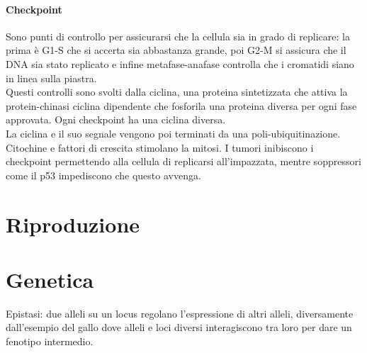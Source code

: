 \documentclass[10pt]{article}
\begin{document}
\paragraph*{Checkpoint} Sono punti di controllo per assicurarsi che la cellula sia in grado di replicare: la prima è G1-S che si accerta sia abbastanza grande, poi G2-M si assicura che il DNA sia stato replicato e infine metafase-anafase controlla che i cromatidi siano in linea sulla piastra.\\
Questi controlli sono svolti dalla ciclina, una proteina sintetizzata che attiva la protein-chinasi ciclina dipendente che fosforila una proteina diversa per ogni fase approvata. Ogni checkpoint ha una ciclina diversa.\\
La ciclina e il suo segnale vengono poi terminati da una poli-ubiquitinazione.\\
Citochine e fattori di crescita stimolano la mitosi. I tumori inibiscono i checkpoint permettendo alla cellula di replicarsi all'impazzata, mentre soppressori come il p53 impediscono che questo avvenga.\\
\section*{Riproduzione}
\section*{Genetica}
Epistasi: due alleli su un locus regolano l'espressione di altri alleli, diversamente dall'esempio del gallo dove alleli e loci diversi interagiscono tra loro per dare un fenotipo intermedio.
\end{document}

